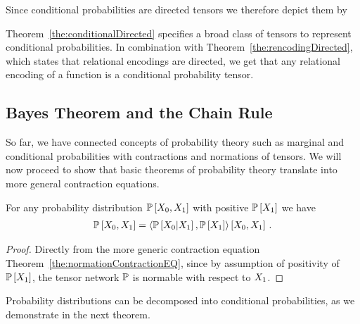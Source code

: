 Since conditional probabilities are directed tensors we therefore depict them by
\begin{center}
	
\end{center}


%
Theorem~\ref{the:conditionalDirected} specifies a broad class of tensors to represent conditional probabilities.
In combination with Theorem~\ref{the:rencodingDirected}, which states that relational encodings are directed, we get that any relational encoding of a function is a conditional probability tensor.

\subsection{Bayes Theorem and the Chain Rule}

So far, we have connected concepts of probability theory such as marginal and conditional probabilities with contractions and normations of tensors.
We will now proceed to show that basic theorems of probability theory translate into more general contraction equations.

\begin{theorem}\label{the:bayes}
	For any probability distribution $\mathbb{P}\left[X_{0}, X_{1}\right]$ with positive $\mathbb{P}\left[X_{1}\right]$ we have
	\begin{align*}
		\mathbb{P}\left[X_{0},X_{1}\right] 
		= \left\langle \mathbb{P}\left[X_{0}|X_{1}\right],\mathbb{P}\left[X_{1}\right]\right\rangle \left[ X_{0},X_{1} \right] \, . 
	\end{align*}
\end{theorem}
\begin{proof}
	Directly from the more generic contraction equation Theorem~\ref{the:normationContractionEQ}, since by assumption of positivity of $\mathbb{P}\left[X_{1}\right]$, the tensor network $\mathbb{P}$ is normable with respect to $X_{1}$.
\end{proof}


Probability distributions can be decomposed into conditional probabilities, as we demonstrate in the next theorem.

